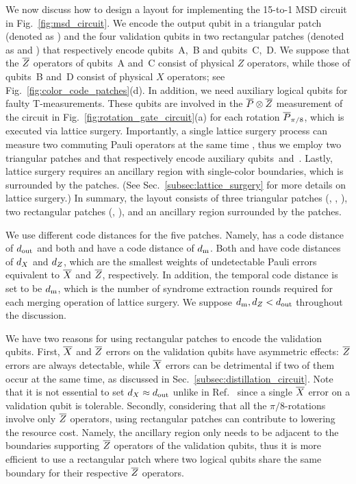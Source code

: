 \documentclass[
 prx,
 reprint,
 superscriptaddress,
 longbibliography,
 dvipsnames
]{revtex4-2}
\begin{document}
We now discuss how to design a layout for implementing the 15-to-1 MSD circuit in Fig.~\ref{fig:msd_circuit}.
We encode the output qubit in a triangular patch (denoted as \patchout) and the four validation qubits in two rectangular patches (denoted as \patchab and \patchcd) that respectively encode qubits~A,~B and qubits~C,~D.
We suppose that the $\overline{Z}$ operators of qubits~A and~C consist of physical $Z$ operators, while those of qubits~B and~D consist of physical $X$ operators; see Fig.~\ref{fig:color_code_patches}(d).
In addition, we need auxiliary logical qubits for faulty T-measurements.
These qubits are involved in the $\overline{P} \otimes \overline{Z}$ measurement of the circuit in Fig.~\ref{fig:rotation_gate_circuit}(a) for each rotation $\overline{P}_{\pi/8}$, which is executed via lattice surgery.
Importantly, a single lattice surgery process can measure two commuting Pauli operators at the same time \cite{thomsen2024low}, thus we employ two triangular patches \patchalpha and \patchbeta that respectively encode auxiliary qubits~\talpha and~\tbeta.
Lastly, lattice surgery requires an ancillary region with single-color boundaries, which is surrounded by the patches.
(See Sec.~\ref{subsec:lattice_surgery} for more details on lattice surgery.)
In summary, the layout consists of three triangular patches (\patchout, \patchalpha, \patchbeta), two rectangular patches (\patchab, \patchcd), and an ancillary region surrounded by the patches.

We use different code distances for the five patches.
Namely, \patchout has a code distance of $d_{\mathrm{out}}$ and both \patchalpha and \patchbeta have a code distance of $d_{\mathrm{m}}$.
Both \patchab and \patchcd have code distances of ${d_X}$ and ${d_Z}$, which are the smallest weights of undetectable Pauli errors equivalent to $\overline{X}$ and $\overline{Z}$, respectively.
In addition, the temporal code distance is set to be $d_{\mathrm{m}}$, which is the number of syndrome extraction rounds required for each merging operation of lattice surgery.
We suppose $d_{\mathrm{m}}, {d_Z} < d_{\mathrm{out}}$ throughout the discussion.

We have two reasons for using rectangular patches to encode the validation qubits.
First, $\overline{X}$ and $\overline{Z}$ errors on the validation qubits have asymmetric effects:
$\overline{Z}$ errors are always detectable, while $\overline{X}$ errors can be detrimental if two of them occur at the same time, as discussed in Sec.~\ref{subsec:distillation_circuit}.
Note that it is not essential to set ${d_X} \approx d_{\mathrm{out}}$ unlike in Ref.~\cite{litinski2019magic} since a single $\overline{X}$ error on a validation qubit is tolerable.
Secondly, considering that all the $\pi/8$-rotations involve only $\overline{Z}$ operators, using rectangular patches can contribute to lowering the resource cost.
Namely, the ancillary region only needs to be adjacent to the boundaries supporting $\overline{Z}$ operators of the validation qubits, thus it is more efficient to use a rectangular patch where two logical qubits share the same boundary for their respective $\overline{Z}$ operators.
\end{document}
